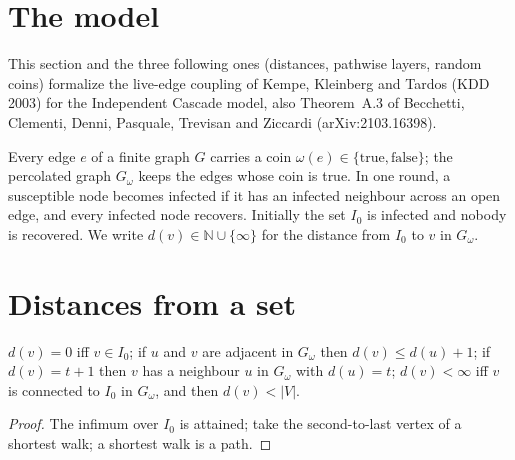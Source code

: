 \section{The model}\label{sec:kkt-live-edge}
This section and the three following ones (distances, pathwise layers, random coins) formalize
the live-edge coupling of Kempe, Kleinberg and Tardos (KDD 2003) for the Independent Cascade
model, also Theorem~A.3 of Becchetti, Clementi, Denni, Pasquale, Trevisan and Ziccardi
(arXiv:2103.16398).

\begin{definition}\label{def:reedfrost}
\leanok
Every edge $e$ of a finite graph $G$ carries a coin $\omega(e)\in\{\mathrm{true},\mathrm{false}\}$;
the percolated graph $G_\omega$ keeps the edges whose coin is true. In one round, a susceptible node
becomes infected if it has an infected neighbour across an open edge, and every infected node
recovers. Initially the set $I_0$ is infected and nobody is recovered. We write $d(v)\in\mathbb N\cup\{\infty\}$
for the distance from $I_0$ to $v$ in $G_\omega$.
\end{definition}

\section{Distances from a set}
\begin{lemma}\label{lem:dist}
\leanok{}
$d(v)=0$ iff $v\in I_0$; if $u$ and $v$ are adjacent in $G_\omega$ then $d(v)\le d(u)+1$; if
$d(v)=t+1$ then $v$ has a neighbour $u$ in $G_\omega$ with $d(u)=t$; $d(v)<\infty$ iff $v$ is
connected to $I_0$ in $G_\omega$, and then $d(v)<|V|$.
\end{lemma}
\begin{proof}\leanok
The infimum over $I_0$ is attained; take the second-to-last vertex of a shortest walk; a shortest
walk is a path.
\end{proof}

